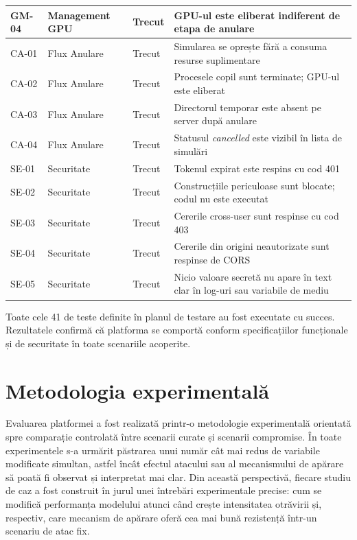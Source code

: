 \documentclass[../../main.tex]{subfiles}
\begin{document}
\begin{longtable}{|p{}|p{}|p{}|p{}|}
            \hline
            GM-04 & Management GPU & Trecut & GPU-ul este eliberat indiferent de etapa de anulare \\
            \hline
            CA-01 & Flux Anulare & Trecut & Simularea se oprește fără a consuma resurse suplimentare \\
            \hline
            CA-02 & Flux Anulare & Trecut & Procesele copil sunt terminate; GPU-ul este eliberat \\
            \hline
            CA-03 & Flux Anulare & Trecut & Directorul temporar este absent pe server după anulare \\
            \hline
            CA-04 & Flux Anulare & Trecut & Statusul \textit{cancelled} este vizibil în lista de simulări \\
            \hline
            SE-01 & Securitate & Trecut & Tokenul expirat este respins cu cod 401 \\
            \hline
            SE-02 & Securitate & Trecut & Construcțiile periculoase sunt blocate; codul nu este executat \\
            \hline
            SE-03 & Securitate & Trecut & Cererile cross-user sunt respinse cu cod 403 \\
            \hline
            SE-04 & Securitate & Trecut & Cererile din origini neautorizate sunt respinse de CORS \\
            \hline
            SE-05 & Securitate & Trecut & Nicio valoare secretă nu apare în text clar în log-uri sau variabile de mediu \\
            \hline
    \end{longtable}
    \normalsize

    Toate cele 41 de teste definite în planul de testare au fost executate cu succes. Rezultatele confirmă că platforma se comportă conform specificațiilor funcționale și de securitate în toate scenariile acoperite.

    \section{Metodologia experimentală}

        Evaluarea platformei a fost realizată printr-o metodologie experimentală orientată spre comparație controlată între scenarii curate și scenarii compromise. În toate experimentele s-a urmărit păstrarea unui număr cât mai redus de variabile modificate simultan, astfel încât efectul atacului sau al mecanismului de apărare să poată fi observat și interpretat mai clar. Din această perspectivă, fiecare studiu de caz a fost construit în jurul unei întrebări experimentale precise: cum se modifică performanța modelului atunci când crește intensitatea otrăvirii și, respectiv, care mecanism de apărare oferă cea mai bună rezistență într-un scenariu de atac fix.
\end{document}

